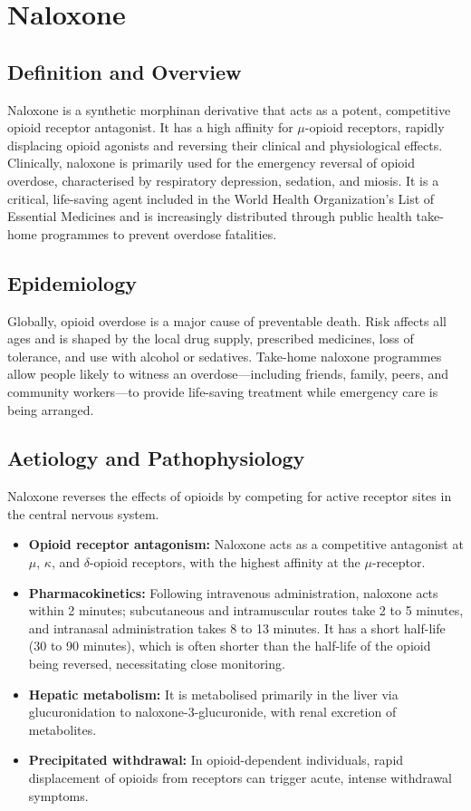 \chapter{Naloxone}

\section*{Definition and Overview}
Naloxone is a synthetic morphinan derivative that acts as a potent, competitive opioid receptor antagonist. It has a high affinity for $\mu$-opioid receptors, rapidly displacing opioid agonists and reversing their clinical and physiological effects. Clinically, naloxone is primarily used for the emergency reversal of opioid overdose, characterised by respiratory depression, sedation, and miosis. It is a critical, life-saving agent included in the World Health Organization's List of Essential Medicines and is increasingly distributed through public health take-home programmes to prevent overdose fatalities.

\section*{Epidemiology}
Globally, opioid overdose is a major cause of preventable death. Risk affects all ages and is shaped by the local drug supply, prescribed medicines, loss of tolerance, and use with alcohol or sedatives. Take-home naloxone programmes allow people likely to witness an overdose—including friends, family, peers, and community workers—to provide life-saving treatment while emergency care is being arranged.

\section*{Aetiology and Pathophysiology}
Naloxone reverses the effects of opioids by competing for active receptor sites in the central nervous system.
\begin{itemize}
    \item \textbf{Opioid receptor antagonism:} Naloxone acts as a competitive antagonist at $\mu$, $\kappa$, and $\delta$-opioid receptors, with the highest affinity at the $\mu$-receptor.
    \item \textbf{Pharmacokinetics:} Following intravenous administration, naloxone acts within 2 minutes; subcutaneous and intramuscular routes take 2 to 5 minutes, and intranasal administration takes 8 to 13 minutes. It has a short half-life (30 to 90 minutes), which is often shorter than the half-life of the opioid being reversed, necessitating close monitoring.
    \item \textbf{Hepatic metabolism:} It is metabolised primarily in the liver via glucuronidation to naloxone-3-glucuronide, with renal excretion of metabolites.
    \item \textbf{Precipitated withdrawal:} In opioid-dependent individuals, rapid displacement of opioids from receptors can trigger acute, intense withdrawal symptoms.
\end{itemize}

